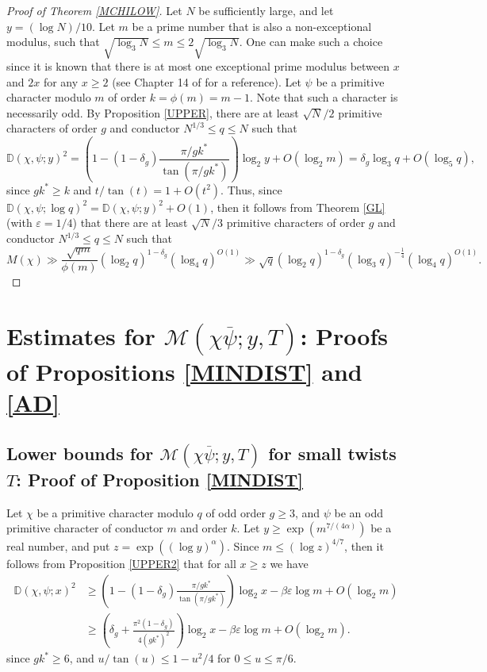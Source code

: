 \documentclass[12pt]{amsart}
\theoremstyle{definition}
\numberwithin{equation}{section}
\newcommand{\mb}{\mathbb}
\newcommand{\mc}{\mathcal}
\renewcommand{\bar}{\overline}
\begin{document}
\begin{proof}[Proof of Theorem \ref{MCHILOW}]
Let $N$ be sufficiently large, and let $y=(\log N)/10$. Let $m$ be a prime number that is also a non-exceptional modulus, such that $\sqrt{\log_3 N}\leq m \leq 2\sqrt{\log_3N}$. One can make such a choice since it is known that there is at most one exceptional prime modulus between $x$ and $2x$ for any $x\geq 2$ (see Chapter 14 of \cite{Da} for a reference). Let $\psi$ be a primitive character modulo $m$ of order $k=\phi(m)=m-1$. Note that such a character is necessarily odd. By Proposition \ref{UPPER}, there are at least $\sqrt{N}/2$ primitive characters of order $g$ and conductor $N^{1/3}\leq q\leq N$ such that 
\begin{equation*}
\mb{D}(\chi,\psi;y)^2 = \left(1-(1-\delta_g)\frac{\pi/gk^{\ast}}{\tan(\pi/gk^{\ast})}\right) \log_2y +O(\log_2 m)= \delta_g \log_3 q + O\left(\log_5 q\right),
\end{equation*}
since $gk^{\ast}\geq k$ and $t/\tan(t)=1+O(t^2)$.
Thus, since $\mb{D}(\chi,\psi;\log q)^2=\mb{D}(\chi,\psi;y)^2+O(1)$, then it follows from Theorem \ref{GL} (with $\varepsilon=1/4$) that there are at least $\sqrt{N}/3$ primitive characters of order $g$ and conductor $N^{1/3}\leq q\leq N$ such that
$$ 
M(\chi) \gg \frac{\sqrt{qm}}{\phi(m)} (\log_2 q)^{1-\delta_g} (\log_4 q)^{O(1)}\gg \sqrt{q} (\log_2 q)^{1-\delta_g} (\log_3 q)^{-\frac14}(\log_4 q)^{O(1)} .
$$
\end{proof}
\section{Estimates for $\mc{M}(\chi\bar{\psi}; y, T)$: Proofs of Propositions \ref{MINDIST} and \ref{AD}}

\subsection{Lower bounds for $\mc{M}(\chi\bar{\psi}; y, T)$ for small twists $T$: Proof of Proposition \ref{MINDIST}}
Let $\chi$ be a primitive character modulo $q$ of odd order $g\geq 3$, and $\psi$ be an odd primitive character of conductor $m$ and order $k$. Let $y\geq \exp(m^{7/(4\alpha)})$ be a real number, and put $z=\exp\left((\log y)^{\alpha}\right)$. Since $m\leq(\log z)^{4/7}$, then it follows from 
Proposition \ref{UPPER2} that for all $x\geq z$ we have
\begin{equation}\label{ProUPPER2}
\begin{aligned}
\mb{D}(\chi, \psi; x)^2 &\geq \left(1-(1-\delta_g)\frac{\pi/gk^{\ast}}{\tan(\pi/gk^{\ast})}\right) \log_2x-\beta \varepsilon \log m+ O\left(\log_2 m\right)\\
&\geq \left(\delta_g+ \frac{\pi^2(1-\delta_g)}{4 (gk^{\ast})^2}\right) \log_2x-\beta \varepsilon \log m+ O\left(\log_2 m\right).
\end{aligned}
\end{equation}
since $g k^{\ast}\geq 6$, and $u/\tan(u)\leq 1-u^2/4$ for $0\leq u\leq \pi/6$. 
\end{document}
